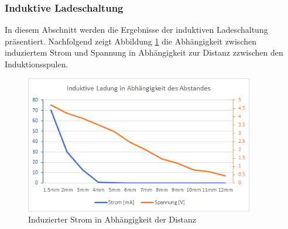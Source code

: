 \subsubsection*{Induktive Ladeschaltung}\label{sec:batterie}
In diesem Abschnitt werden die Ergebnisse der induktiven Ladeschaltung präsentiert. Nachfolgend zeigt Abbildung \ref{fig:InduzierterStrom} die Abhängigkeit zwischen induziertem Strom und Spannung in Abhängigkeit zur Distanz \glqq z\grqq zwischen den Induktionsspulen.

\begin{figure}[H]
	\begin{center}
		\includegraphics[width=100mm]{data/InduktiveLadung.png}
		\caption[Induzierter Strom in Abhängigkeit der Distanz]{Induzierter Strom in Abhängigkeit der Distanz} %
		\label{fig:InduzierterStrom}
	\end{center}
\end{figure}

